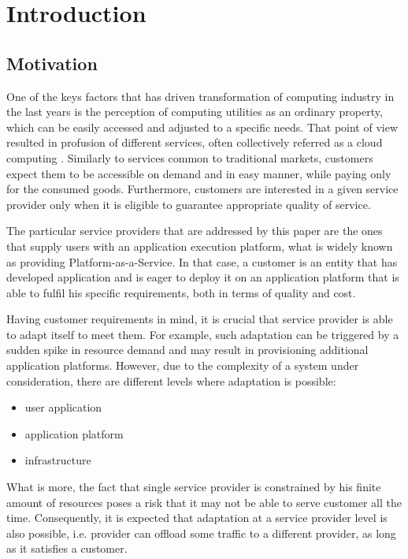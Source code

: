 \chapter{Introduction}

\section{Motivation}
One of the keys factors that has driven transformation of computing industry in the last years is the perception of computing utilities as an ordinary property\cite{BuYeVeBrBr09}, which can be easily accessed and adjusted to a specific needs. That point of view resulted in profusion of different services, often collectively referred as a cloud computing \cite{MeGr11}. Similarly to services common to traditional markets, customers expect them to be accessible on demand and in easy manner, while paying only for the consumed goods. Furthermore, customers are interested in a given service provider only when it is eligible to guarantee appropriate quality of service.

The particular service providers that are addressed by this paper are the ones that supply users with an application execution platform, what is widely known as providing Platform-as-a-Service. In that case, a customer is an entity that has developed application and is eager to deploy it on an application platform that is able to fulfil his specific requirements, both in terms of quality and cost.

Having customer requirements in mind, it is crucial that service provider is able to adapt itself to meet them. For example, such adaptation can be triggered by a sudden spike in resource demand and may result in provisioning additional application platforms. However, due to the complexity of a system under consideration, there are different levels where adaptation is possible:
\begin{itemize}
	\item user application
	\item application platform
	\item infrastructure
\end{itemize} 
What is more, the fact that single service provider is constrained by his finite amount of resources poses a risk that it may not be able to serve customer all the time. Consequently, it is expected that adaptation at a service provider level is also possible, i.e. provider can offload some traffic to a different provider, as long as it satisfies a customer.

